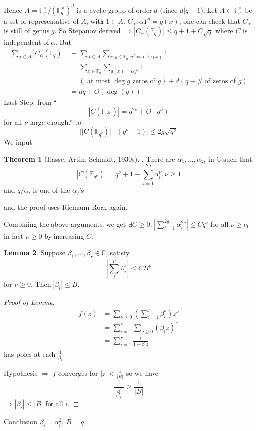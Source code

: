 \documentclass[11pt]{article}
\theoremstyle{definition}
\newtheorem{thm}{Theorem}[section]
\newtheorem{lemma}[thm]{Lemma}
\newcommand{\cplx}{\mathbb C}
\newcommand{\bbf}{\mathbb F}
\newcommand{\Lrta}{\Longrightarrow}
\begin{document}
Hence $A=\bbf^\times_q/(\bbf^\times_q)^d$ is a cyclic group of order $d$ (since $d|q-1$). Let $A\subset \bbf^\times_q$ be a set of  representative of $\tilde{A}$, with $1\in A$.
$C_\alpha:\alpha Y^d=g(x)$, one can check that $C_\alpha$ is still of genus $g$. So Stepanov derived 
$\Lrta |C_\alpha(\bbf_q)|\leq q+1+C\sqrt{q}$ where $C$ is independent of $\alpha$.  But
 $$
 \begin{aligned}
 \sum_{\alpha\in A}|C_\alpha(\bbf_q)|&=\sum_{\alpha\in A}\sum_{x,y\in \bbf_q, y^d=\alpha^{-1}g(x)}1\\
 &=\sum_{x\in \bbf_q}\sum_{g(x)=\alpha y^d}1\\
 &=(\text{ at most $\deg g$ zeros of $g$})+ d(q-\# \text{ of zeros of $g$} )\\
 &= dq +O(\deg (g)).
 \end{aligned}
 $$
 Last Step: from ``
  $$
  |C(\bbf_{q^{2\nu}})|=q^{2\nu}+O(q^\nu)
  $$
  for all $\nu$ large enough.''
  to
  $$
||C(\bbf_{q^\nu})|-(q^\nu+1)|\leq 2g \sqrt{q^\nu}
  $$
We input 
\begin{thm}
[Hasse, Artin. Schmidt, 1930s]. There are $\alpha_1,...,\alpha_{2g}$ in $\cplx$ such that
 $$|C(\bbf_{q^\nu})|=q^\nu+1-\sum^{2g}_{i=1}\alpha_i^\nu, \nu \geq 1$$ 
 and $q/\alpha_i$ is one of the $\alpha_j$'s
\end{thm}
and the proof uses Riemann-Roch again.

Combining the above arguments, we get
$\exists C\geq 0$, $|\sum_{i=1}^{2g}\alpha_i^{2\nu}|\leq C q^\nu$ for all $\nu \geq \nu_0$ in fact $\nu \geq 0$ by increasing $C$. 
\begin{lemma}
Suppose $\beta_1,...,\beta_r\in \cplx$, satisfy 
$$
|\sum_i^\nu \beta_i^r|\leq C B^\nu
$$
for $\nu \geq 0$. Then $|\beta_i|\leq B$. 
\end{lemma}
\begin{proof}[Proof of Lemma]
$$
\begin{aligned}
f(z)&=\sum_{\nu \geq 0}\left(\sum_{i=1}^r\beta_i^\nu\right)z^\nu\\
&=\sum_{i=1}^r\sum_{\nu\geq 0}(\beta_i z)^\nu\\
&=\sum^r_{i=1}\frac{1}{1-\beta_i z}
\end{aligned}
$$
has poles at each $\frac{1}{\beta_i}$.

Hypothesis $\Lrta$ $f$ converges for $|z|<\frac{1}{|B|}$ so we have
$$
\frac{1}{|\beta_i|}\geq \frac{1}{|B|}
$$
$\Lrta |\beta_i|\leq |B|$ for all $i$.
\end{proof}

\underline{Conclusion}
$\beta_i=\alpha_i^2$, $B=q$
\end{document}
